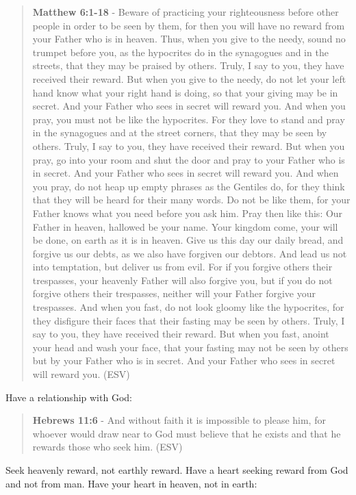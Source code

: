 \documentclass[11pt]{article}
\begin{document}
\begin{quote}
\textbf{Matthew 6:1-18} - Beware of practicing your righteousness before other people in order to be seen by them, for then you will have no reward from your Father who is in heaven. Thus, when you give to the needy, sound no trumpet before you, as the hypocrites do in the synagogues and in the streets, that they may be praised by others. Truly, I say to you, they have received their reward. But when you give to the needy, do not let your left hand know what your right hand is doing, so that your giving may be in secret. And your Father who sees in secret will reward you. And when you pray, you must not be like the hypocrites. For they love to stand and pray in the synagogues and at the street corners, that they may be seen by others. Truly, I say to you, they have received their reward. But when you pray, go into your room and shut the door and pray to your Father who is in secret. And your Father who sees in secret will reward you. And when you pray, do not heap up empty phrases as the Gentiles do, for they think that they will be heard for their many words. Do not be like them, for your Father knows what you need before you ask him. Pray then like this: Our Father in heaven, hallowed be your name. Your kingdom come, your will be done, on earth as it is in heaven. Give us this day our daily bread, and forgive us our debts, as we also have forgiven our debtors. And lead us not into temptation, but deliver us from evil. For if you forgive others their trespasses, your heavenly Father will also forgive you, but if you do not forgive others their trespasses, neither will your Father forgive your trespasses. And when you fast, do not look gloomy like the hypocrites, for they disfigure their faces that their fasting may be seen by others. Truly, I say to you, they have received their reward. But when you fast, anoint your head and wash your face, that your fasting may not be seen by others but by your Father who is in secret. And your Father who sees in secret will reward you. (ESV)
\end{quote}

Have a relationship with God:

\begin{quote}
\textbf{Hebrews 11:6} - And without faith it is impossible to please him, for whoever would draw near to God must believe that he exists and that he rewards those who seek him. (ESV)
\end{quote}

Seek heavenly reward, not earthly reward. Have a heart seeking reward from God and not from man. Have your heart in heaven, not in earth:
\end{document}
